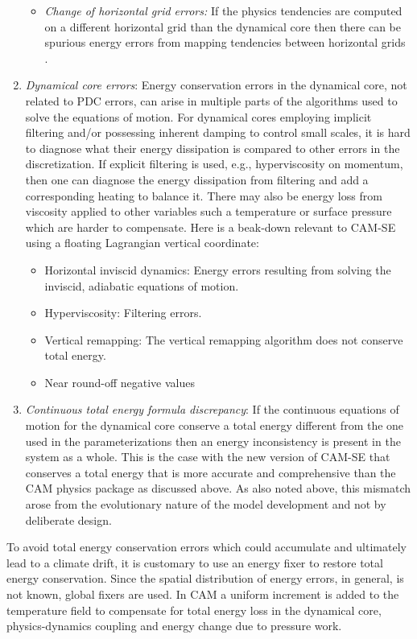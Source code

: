 \documentclass{agujournal}
\begin{document}
\begin{enumerate}
\begin{itemize}
\item {\em{Change of horizontal grid errors:}} If the physics tendencies are computed on a different horizontal grid than the dynamical core then there can be spurious energy errors from mapping tendencies between horizontal grids \citep[e.g., ][]{HetAl2018MWR}. 
\end{itemize}
\item {\em{Dynamical core errors}}: Energy conservation errors in the dynamical core, not related to PDC errors, can arise in multiple parts of the algorithms used to solve the equations of motion. For dynamical cores employing implicit filtering \citep[e.g., limiters in flux operators ][]{L2004MWR} and/or possessing inherent damping to control small scales, it is hard to diagnose what their energy dissipation is compared to other errors in the discretization. If explicit filtering is used, e.g., hyperviscosity on momentum, then one can diagnose the energy dissipation from filtering and add a corresponding heating to balance it. There may also be energy loss from viscosity applied to other variables such a temperature or surface pressure which are harder to compensate. Here is a beak-down relevant to CAM-SE using a floating Lagrangian vertical coordinate:
\begin{itemize}
\item Horizontal inviscid dynamics: Energy errors resulting from solving the inviscid, adiabatic equations of motion.
\item Hyperviscosity: Filtering errors.
\item Vertical remapping: The vertical remapping algorithm does not conserve total energy.
\item Near round-off negative values
\end{itemize}
\item {\em{Continuous total energy formula discrepancy}}:  If the continuous equations of motion for the dynamical core conserve a total energy different from the one used in the parameterizations then an energy inconsistency is present in the system as a whole. This is the case with the new version of CAM-SE that conserves a total energy that is more accurate and comprehensive than the CAM physics package as discussed above. As also noted above, this mismatch arose from the evolutionary nature of the model development and not by deliberate design.
\end{enumerate}
To avoid total energy conservation errors which could accumulate and ultimately lead to a climate drift, it is customary to use an energy fixer to restore total energy conservation. Since the spatial distribution of energy errors, in general, is not known, global fixers are used. In CAM a uniform increment is added to the temperature field to compensate for total energy loss in the dynamical core, physics-dynamics coupling and energy change due to pressure work. 
%
\end{document}
